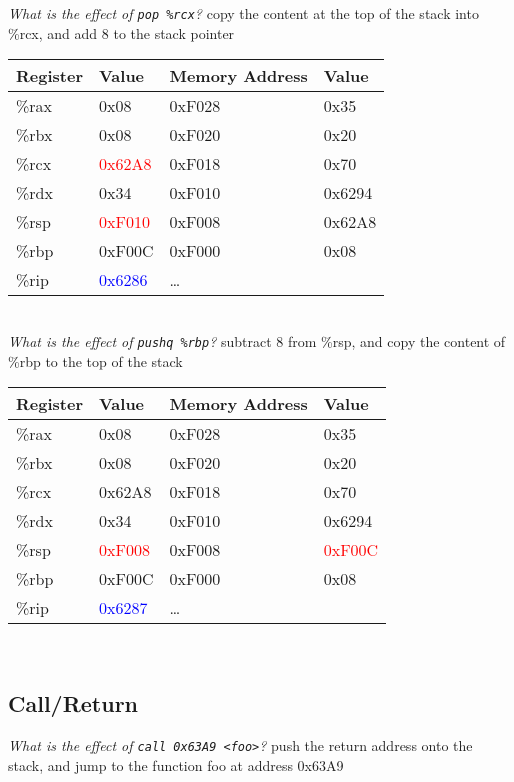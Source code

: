 \documentclass{article}
\begin{document}
\textit{What is the effect of \texttt{pop \%rcx}?} copy the content at the top of the stack into \%rcx, and add 8 to the stack pointer \\
\begin{tabular}{|l|l||l|l|} \hline
Register & Value & Memory Address & Value \\ \hline
\%rax & 0x08   & 0xF028 & 0x35   \\ \hline
\%rbx & 0x08   & 0xF020 & 0x20   \\ \hline
\%rcx & \textcolor{red}{0x62A8} & 0xF018 & 0x70   \\ \hline
\%rdx & 0x34   & 0xF010 & 0x6294 \\ \hline
\%rsp & \textcolor{red}{0xF010} & 0xF008 & 0x62A8 \\ \hline
\%rbp & 0xF00C & 0xF000 & 0x08   \\ \hline
\%rip & \textcolor{blue}{0x6286} & \dots  &        \\ \hline
\end{tabular} \\

\textit{What is the effect of \texttt{pushq \%rbp}?} subtract 8 from \%rsp, and copy the content of \%rbp to the top of the stack \\
\begin{tabular}{|l|l||l|l|} \hline
Register & Value & Memory Address & Value \\ \hline
\%rax & 0x08   & 0xF028 & 0x35   \\ \hline
\%rbx & 0x08   & 0xF020 & 0x20   \\ \hline
\%rcx & 0x62A8 & 0xF018 & 0x70   \\ \hline
\%rdx & 0x34   & 0xF010 & 0x6294 \\ \hline
\%rsp & \textcolor{red}{0xF008} & 0xF008 & \textcolor{red}{0xF00C} \\ \hline
\%rbp & 0xF00C & 0xF000 & 0x08   \\ \hline
\%rip & \textcolor{blue}{0x6287} & \dots  &        \\ \hline
\end{tabular} \\

\subsection{Call/Return}

\textit{What is the effect of \texttt{call 0x63A9 <foo>}?} push the return address onto the stack, and jump to the function foo at address 0x63A9
\end{document}

